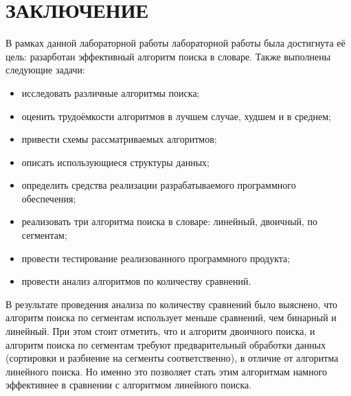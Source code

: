 \chapter*{ЗАКЛЮЧЕНИЕ}

В рамках данной лабораторной работы лабораторной работы была достигнута её цель: разарботан эффективный алгоритм поиска в словаре. Также выполнены следующие задачи:
\begin{itemize}
	\item исследовать различные алгоритмы поиска;
	\item оценить трудоёмкости алгоритмов в лучшем случае, худшем и в среднем;
	\item привести схемы рассматриваемых алгоритмов;
	\item описать использующиеся структуры данных;
	\item определить средства реализации разрабатываемого программного обеспечения;
	\item реализовать три алгоритма поиска в словаре: линейный, двоичный, по сегментам;
	\item провести тестирование реализованного программного продукта;
	\item провести анализ алгоритмов по количеству сравнений.
\end{itemize}

В результате проведения анализа по количеству сравнений было выяснено, что алгоритм поиска по сегментам использует меньше сравнений, чем бинарный и линейный. При этом стоит отметить, что и алгоритм двоичного поиска, и алгоритм поиска по сегментам требуют предварительный обработки данных (сортировки и разбиение на сегменты соответственно), в отличие от алгоритма линейного поиска. Но именно это позволяет стать этим алгоритмам намного эффективнее в сравнении с алгоритмом линейного поиска.